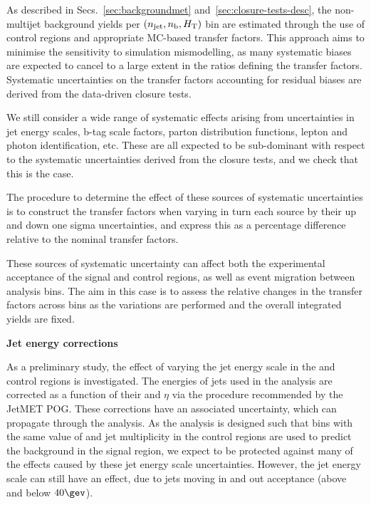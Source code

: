 As described in Secs.~\ref{sec:backgroundmet}
and~\ref{sec:closure-tests-desc}, the non-multijet background yields
per $(n_{\text{jet}},n_{\text{b}},\mbox{$H_\text{T}$})$ bin are estimated through the use of control
regions and appropriate MC-based transfer factors. This approach aims
to minimise the sensitivity to simulation mismodelling, as many
systematic biases are expected to cancel to a large extent in the
ratios defining the transfer factors. Systematic uncertainties on the
transfer factors accounting for residual biases are derived from the
data-driven closure tests.

We still consider a wide range of systematic effects arising from
uncertainties in jet energy scales, b-tag scale factors, parton
distribution functions, lepton and photon identification, etc. These
are all expected to be sub-dominant with respect to the systematic
uncertainties derived from the closure tests, and we check that this
is the case.

The procedure to determine the effect of these sources of systematic
uncertainties is to construct the transfer factors when varying in
turn each source by their up and down one sigma uncertainties, and
express this as a percentage difference relative to the nominal
transfer factors.

These sources of systematic uncertainty can affect both the
experimental acceptance of the signal and control regions, as well as
event migration between analysis bins. 
The aim in this case is to assess the relative changes in the transfer
factors across bins as the variations are performed and the overall
integrated yields are fixed.

{\bf Jet energy corrections}

As a preliminary study, the effect of varying the jet energy scale in
the \mj and \mmj control regions is investigated.  The energies of
jets used in the analysis are corrected as a function of their \pt and
$\eta$ via the procedure recommended by the JetMET POG. These
corrections have an associated uncertainty, which can propagate
through the analysis.  As the analysis is designed such that bins with
the same value of \scalht and jet multiplicity in the control regions
are used to predict the background in the signal region, we expect to
be protected against many of the effects caused by these jet energy
scale uncertainties. However, the jet energy scale can still have an
effect, due to jets moving in and out acceptance (above and below
$40\gev$).

